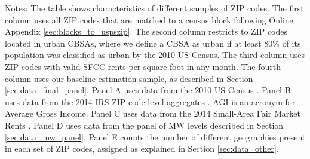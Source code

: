 \begin{landscape}
\begin{table}[hbt!]
    \begin{minipage}{.95\linewidth} \footnotesize
        \vspace{2mm}
        Notes: The table shows characteristics of different samples of ZIP codes.
        The first column uses all ZIP codes that are matched to a census block
        following Online Appendix \ref{sec:blocks_to_uspszip}.
        The second column restricts to ZIP codes located in urban CBSAs, where 
        we define a CBSA as urban if at least 80\% of its population was 
        classified as urban by the 2010 US Census.
        The third column uses ZIP codes with valid SFCC rents per square
        foot in any month.
        The fourth column uses our baseline estimation sample, as described in
        Section \ref{sec:data_final_panel}.
        Panel A uses data from the 2010 US Census \parencite{CensusDecennial}.
        Panel B uses data from the 2014 IRS ZIP code-level aggregates
        \parencite{IRS}. AGI is an acronym for Average Gross Income.
        Panel C uses data from the 2014 Small-Area Fair Market 
        Rents \parencite[SAFMR;][]{hudSAFMR}.
        Panel D uses data from the panel of MW levels
        described in Section \ref{sec:data_mw_panel}.
        Panel E counts the number of different geographies present in each set
        of ZIP codes, assigned as explained in Section \ref{sec:data_other}.
    \end{minipage}
\end{table}
\end{landscape}
